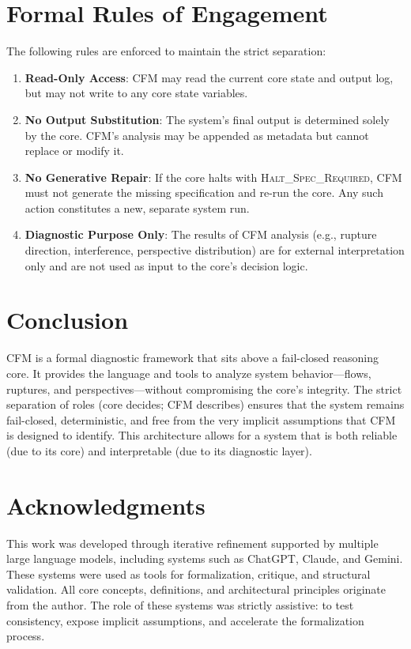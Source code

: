 \documentclass{article}
\begin{document}
\section{Formal Rules of Engagement}
The following rules are enforced to maintain the strict separation:
\begin{enumerate}
\item \textbf{Read-Only Access}: CFM may read the current core state and output log, but may not write to any core state variables.
\item \textbf{No Output Substitution}: The system's final output is determined solely by the core. CFM's analysis may be appended as metadata but cannot replace or modify it.
\item \textbf{No Generative Repair}: If the core halts with \textsc{Halt\_Spec\_Required}, CFM must not generate the missing specification and re-run the core. Any such action constitutes a new, separate system run.
\item \textbf{Diagnostic Purpose Only}: The results of CFM analysis (e.g., rupture direction, interference, perspective distribution) are for external interpretation only and are not used as input to the core's decision logic.
\end{enumerate}

\section{Conclusion}
CFM is a formal diagnostic framework that sits above a fail-closed reasoning core. It provides the language and tools to analyze system behavior---flows, ruptures, and perspectives---without compromising the core's integrity. The strict separation of roles (core decides; CFM describes) ensures that the system remains fail-closed, deterministic, and free from the very implicit assumptions that CFM is designed to identify. This architecture allows for a system that is both reliable (due to its core) and interpretable (due to its diagnostic layer).

\section*{Acknowledgments}
This work was developed through iterative refinement supported by multiple large language models, including systems such as ChatGPT, Claude, and Gemini. These systems were used as tools for formalization, critique, and structural validation. All core concepts, definitions, and architectural principles originate from the author. The role of these systems was strictly assistive: to test consistency, expose implicit assumptions, and accelerate the formalization process.
\end{document}
